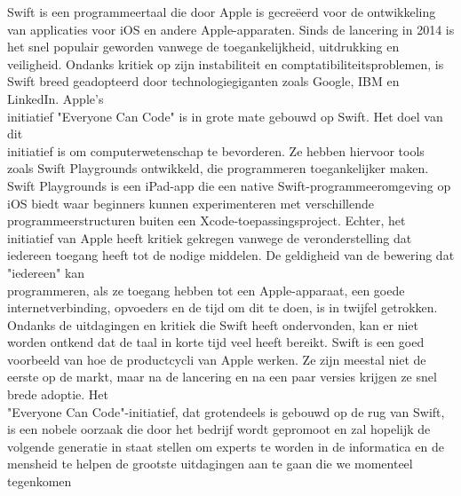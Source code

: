 Swift is een programmeertaal die door Apple is gecreëerd voor de ontwikkeling van applicaties voor iOS en andere Apple-apparaten. Sinds de lancering in 2014 is het snel populair geworden vanwege de toegankelijkheid, uitdrukking en veiligheid. Ondanks kritiek op zijn instabiliteit en comptatibiliteitsproblemen, is Swift breed geadopteerd door technologiegiganten zoals Google, IBM en LinkedIn.
Apple's \\initiatief "Everyone Can Code" is in grote mate gebouwd op Swift. Het doel van dit \\initiatief is om computerwetenschap te bevorderen. Ze hebben hiervoor tools zoals Swift Playgrounds ontwikkeld, die programmeren toegankelijker maken. Swift Playgrounds is een iPad-app die een native Swift-programmeeromgeving op iOS biedt waar beginners kunnen experimenteren met verschillende programmeerstructuren buiten een Xcode-toepassingsproject.
Echter, het initiatief van Apple heeft kritiek gekregen vanwege de veronderstelling dat iedereen toegang heeft tot de nodige middelen. De geldigheid van de bewering dat "iedereen" kan \\programmeren, als ze toegang hebben tot een Apple-apparaat, een goede \\internetverbinding, opvoeders en de tijd om dit te doen, is in twijfel getrokken.
Ondanks de uitdagingen en kritiek die Swift heeft ondervonden, kan er niet worden ontkend dat de taal in korte tijd veel heeft bereikt. Swift is een goed voorbeeld van hoe de productcycli van Apple werken. Ze zijn meestal niet de eerste op de markt, maar na de lancering en na een paar versies krijgen ze snel brede adoptie. Het \\"Everyone Can Code"-initiatief, dat grotendeels is gebouwd op de rug van Swift, is een nobele oorzaak die door het bedrijf wordt gepromoot en zal hopelijk de \\volgende generatie in staat stellen om experts te worden in de informatica en de mensheid te helpen de grootste uitdagingen aan te gaan die we momenteel \\tegenkomen \autocite{Weninger2020}


